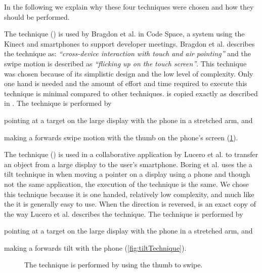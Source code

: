 In the following we explain why these four techniques were chosen and how they should be performed.

The \swipe technique () is used by Bragdon et al. \cite{Bragdon:2011} in Code Space, a system using the Kinect and smartphones to support developer meetings. 
Bragdon et al. describes the technique as: \emph{``cross-device interaction with touch and air pointing''} and the swipe motion is described as \emph{``flicking up on the touch screen''}. 
This technique was chosen because of its simplistic design and the low level of complexity.
Only one hand is needed and the amount of effort and time required to execute this technique is minimal compared to other techniques.
\swipe is copied exactly as described in \cite{Bragdon:2011}.
The \swipe technique is performed by 
\begin{enumerate*}[label=\itshape\roman*\upshape)]
	\item{pointing at a target on the large display with the phone in a stretched arm, and}
	\item{making a forwards swipe motion with the thumb on the phone's screen (\cref{fig:swipeTechnique}).}
\end{enumerate*}

The \tilt technique () is used in a collaborative application by Lucero et al. \cite{Lucero:2012} to transfer an object from a large display to the user's smartphone.
Boring et al. uses the a tilt technique in \cite{Boring:2009} when moving a pointer on a display using a phone and though not the same application, the execution of the technique is the same.
We chose this technique because it is one handed, relatively low complexity, and much like the \swipe it is generally easy to use.
When the direction is reversed, \tilt is an exact copy of the way Lucero et al. describes the technique.
The \tilt technique is performed by 
\begin{enumerate*}[label=\itshape\roman*\upshape)]
	\item{pointing at a target on the large display with the phone in a stretched arm, and}
	\item{making a forwards tilt with the phone (\cref{fig:tiltTechnique}).}
\end{enumerate*}

\begin{figure}[H]
\caption{
	\protect{} The \swipe technique is performed by using the thumb to swipe.
}
\label{fig:swipeTechnique}
\end{figure}

